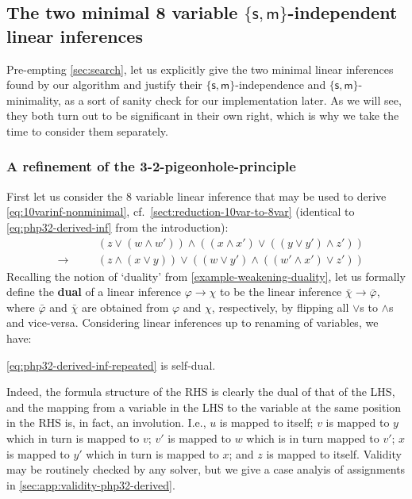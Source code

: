 \documentclass[a4paper, UKenglish, cleveref]{lipics-v2021}
\renewcommand{\phi}{\varphi}
\newcommand{\m}{\ensuremath{\mathsf{m}}}
\newcommand{\s}{\ensuremath{\mathsf{s}}}
\begin{document}
\subsection{The two minimal 8 variable $\{\s,\m\}$-independent linear inferences}
\label{sec:two-found-inferences}
Pre-empting \cref{sec:search}, let us explicitly give the two minimal linear inferences found by our algorithm and justify their $\{\s,\m \}$-independence and $\{\s,\m \}$-minimality, as a sort of sanity check for our implementation later.
As we will see, they both turn out to be significant in their own right, which is why we take the time to consider them separately.


%
%


\subsubsection{A refinement of the 3-2-pigeonhole-principle}
\label{sec:php32-refined}
First let us consider the 8 variable linear inference that may be used to derive \cref{eq:10varinf-nonminimal}, cf.~\cref{sect:reduction-10var-to-8var} (identical to \eqref{eq:php32-derived-inf} from the introduction):%
\begin{equation}
\label{eq:php32-derived-inf-repeated}
\begin{alignedat}{2}
&&& (z \lor (w \land w')) \land ((x \land x') \lor ((y \lor y') \land z')) \\
&\to &\quad& (z \land (x \lor y)) \lor ((w \lor y') \land ((w' \land x') \lor z'))
\end{alignedat}
\end{equation}
Recalling the notion of `duality' from \cref{example-weakening-duality}, let us formally define the \textbf{dual} of a linear inference $\phi \to \chi$ to be the linear inference $\bar \chi \to \bar \phi$, where $\bar \phi$ and $\bar \chi$ are obtained from $\phi$ and $\chi$, respectively, by flipping all $\lor$s to $\land$s and vice-versa.
Considering linear inferences up to renaming of variables, we have:

\begin{observation}
\label{duality-of-php32-8var}
\eqref{eq:php32-derived-inf-repeated} is self-dual.
\end{observation}
\noindent
Indeed, the formula structure of the RHS is clearly the dual of that of the LHS, and the mapping from a variable in the LHS to the variable at the same position in the RHS is, in fact, an involution. I.e., $u$ is mapped to itself; $v$ is mapped to $y$ which in turn is mapped to $v$; $v'$ is mapped to $w$ which is in turn mapped to $v'$; $x $ is mapped to $y'$ which in turn is mapped to $x$; and $z$ is mapped to itself.
Validity may be routinely checked by any solver, but we give a case analyis of assignments in \cref{sec:app:validity-php32-derived}.
\end{document}
